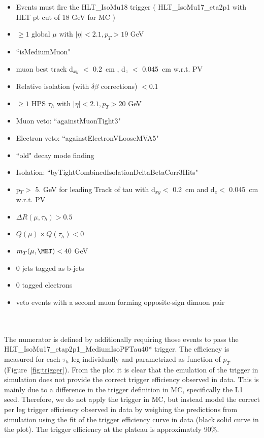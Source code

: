 \begin{itemize}
  \item Events must fire the HLT{\_}IsoMu18 trigger ( HLT{\_}IsoMu17{\_}eta2p1 with HLT pt cut of 18 GeV for MC )
  \item $\ge 1$ global $\mu$ with $|\eta| < 2.1, p_{T} > 19$ GeV
  \item ``isMediumMuon"
  \item muon best track d$_{xy}$ $<$ 0.2~cm , d$_{z}$ $<$ 0.045~cm w.r.t. PV
  \item Relative isolation (with $\delta\beta$ corrections) $< 0.1$
  \item $\ge 1$ HPS $\tau_{h}$ with $|\eta| < 2.1, p_{T} > 20$ GeV
  \item Muon veto: ``againstMuonTight3"
  \item Electron veto: ``againstElectronVLooseMVA5"
  \item ``old" decay mode finding %
  \item Isolation: ``byTightCombinedIsolationDeltaBetaCorr3Hits"
  \item p$_{T} >$ 5. GeV for leading Track of tau with d$_{xy} <$ 0.2~cm and d$_{z} <$ 0.045~cm w.r.t. PV
  \item $\Delta R(\mu,\tau_{h}) > 0.5$
  \item $Q(\mu) \times Q(\tau_{h}) < 0 $
  \item $m_{T}(\mu,\MET) < 40$ GeV
  \item 0 jets tagged as b-jets
  \item 0 tagged electrons
  \item veto events with a second muon forming opposite-sign dimuon pair
\end{itemize}\\\\

The numerator is defined by additionally requiring those events to 
pass the \\ 
HLT{\_}IsoMu17{\_}etap2p1{\_}MediumIsoPFTau40* trigger. 
The efficiency is measured for each $\tau_{h}$ leg individually and
parametrized as function of $p_{T}$ (Figure~\ref{fig:trigger}). From the 
plot it is clear that the emulation of the trigger in simulation does not 
provide the correct trigger efficiency observed in data. This is mainly 
due to a difference in the trigger definition in MC, specifically the 
L1 seed. Therefore, we do not apply the trigger in MC, but instead model 
the correct per leg trigger efficiency observed in data by weighing the 
predictions from simulation using the fit of the trigger efficiency 
curve in data (black solid curve in the plot). The trigger efficiency at 
the plateau is approximately 90\%. 

